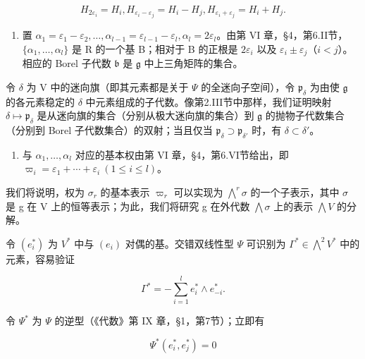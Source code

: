 \[
H _ {2 \varepsilon_ {i}} = H _ {i}, H _ {\varepsilon_ {i} - \varepsilon_ {j}} = H _ {i} - H _ {j}, H _ {\varepsilon_ {i} + \varepsilon_ {j}} = H _ {i} + H _ {j}.
\]

\begin{enumerate}
\def\labelenumi{(\Roman{enumi})}
\setcounter{enumi}{2}
\tightlist
\item
置 \(\alpha_{1} = \varepsilon_{1} - \varepsilon_{2},\ldots ,\alpha_{l - 1} = \varepsilon_{l - 1} - \varepsilon_{l},\alpha_{l} = 2\varepsilon_{l}\)。由第 VI 章，§4，第6.II节，\(\{\alpha_1,\dots ,\alpha_l\}\) 是 R 的一个基 B；相对于 B 的正根是 \(2\varepsilon_{i}\) 以及 \(\varepsilon_{i}\pm \varepsilon_{j}\)（\(i < j\)）。相应的 Borel 子代数 \(\mathfrak{b}\) 是 \(\mathfrak{g}\) 中上三角矩阵的集合。
\end{enumerate}

令 \(\delta\) 为 V 中的迷向旗（即其元素都是关于 \(\varPsi\) 的全迷向子空间），令 \(\mathfrak{p}_{\delta}\) 为由使 \(\mathfrak{g}\) 的各元素稳定的 \(\delta\) 中元素组成的子代数。像第2.III节中那样，我们证明映射 \(\delta \mapsto \mathfrak{p}_{\delta}\) 是从迷向旗的集合（分别从极大迷向旗的集合）到 \(\mathfrak{g}\) 的抛物子代数集合（分别到 Borel 子代数集合）的双射；当且仅当 \(\mathfrak{p}_{\delta} \supset \mathfrak{p}_{\delta'}\) 时，有 \(\delta \subset \delta'\)。

\begin{enumerate}
\def\labelenumi{(\Roman{enumi})}
\setcounter{enumi}{3}
\tightlist
\item
与 \(\alpha_{1},\ldots,\alpha_{l}\) 对应的基本权由第 VI 章，§4，第6.VI节给出，即 \(\varpi_{i}=\varepsilon_{1}+\cdots+\varepsilon_{i}\ (1\leq i\leq l)\)。
\end{enumerate}

我们将说明，权为 \(\sigma_{r}\) 的基本表示 \(\varpi_{r}\) 可以实现为 \(\bigwedge^{r}\sigma\) 的一个子表示，其中 \(\sigma\) 是 g 在 V 上的恒等表示；为此，我们将研究 g 在外代数 \(\bigwedge\sigma\) 上的表示 \(\bigwedge V\) 的分解。

令 \((e_{i}^{*})\) 为 \(V^{*}\) 中与 \((e_{i})\) 对偶的基。交错双线性型 \(\varPsi\) 可识别为 \(\varGamma^{*}\in\bigwedge^{2}V^{*}\) 中的元素，容易验证

\[
\Gamma^ {*} = - \sum_ {i = 1} ^ {l} e _ {i} ^ {*} \wedge e _ {- i} ^ {*}.
\]

令 \(\varPsi^{*}\) 为 \(\varPsi\) 的逆型（《代数》第 IX 章，§1，第7节）；立即有

\[
\varPsi^ {*} (e _ {i} ^ {*}, e _ {j} ^ {*}) = 0
\]

